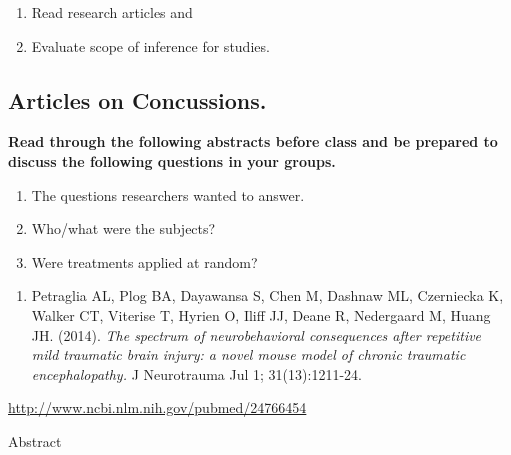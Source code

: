 \documentclass[
]{report}
\providecommand{\tightlist}{%
  \setlength{\itemsep}{0pt}\setlength{\parskip}{0pt}}
\begin{document}
\begin{enumerate}
\def\labelenumi{\arabic{enumi}.}
\item
  Read research articles and
\item
  Evaluate scope of inference for studies.
\end{enumerate}

\hypertarget{articles-on-concussions.}{%
\subsection*{Articles on Concussions.}\label{articles-on-concussions.}}

\textbf{Read through the following abstracts before class and be prepared to discuss the following questions in your groups.}

\begin{enumerate}
\def\labelenumi{(\alph{enumi})}
\item
  The questions researchers wanted to answer.
\item
  Who/what were the subjects?
\item
  Were treatments applied at random?
\end{enumerate}

\begin{enumerate}
\def\labelenumi{\arabic{enumi}.}
\tightlist
\item
  Petraglia AL, Plog BA, Dayawansa S, Chen M, Dashnaw ML, Czerniecka K, Walker CT, Viterise T, Hyrien O, Iliff JJ, Deane R, Nedergaard M, Huang JH. (2014). \emph{The spectrum of neurobehavioral consequences after repetitive mild traumatic brain injury: a novel mouse model of chronic traumatic encephalopathy.}
  J Neurotrauma Jul 1; 31(13):1211-24.
\end{enumerate}

\url{http://www.ncbi.nlm.nih.gov/pubmed/24766454}

Abstract
\end{document}

